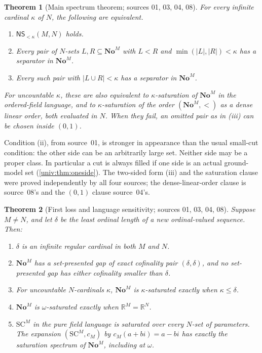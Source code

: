 \documentclass[11pt,letterpaper]{article}
\numberwithin{equation}{section}
\newtheorem{theorem}{Theorem}[section]
\theoremstyle{definition}
\theoremstyle{remark}
\newcommand{\No}{\mathbf{No}}
\newcommand{\SC}{\mathrm{SC}}
\newcommand{\NoM}{\No^{M}}
\newcommand{\SCM}{\SC^{M}}
\newcommand{\R}{\mathbb R}
\newcommand{\NS}{\mathsf{NS}}
\newcommand{\abs}[1]{\lvert#1\rvert}
\begin{document}
\begin{theorem}[Main spectrum theorem; sources 01, 03, 04, 08]\label{univ:thm:main-summary}
For every infinite cardinal $\kappa$ of $N$, the following are equivalent.
\begin{enumerate}[label=\textnormal{(\roman*)}]
\item $\NS_{<\kappa}(M,N)$ holds.
\item Every pair of $N$-sets $L,R\subseteq\NoM$ with $L<R$ and
$\min(\abs L,\abs R)<\kappa$ has a separator in $\NoM$.
\item Every such pair with $\abs{L\cup R}<\kappa$ has a separator in $\NoM$.
\end{enumerate}
For uncountable $\kappa$, these are also equivalent to $\kappa$-saturation of
$\NoM$ in the ordered-field language, and to $\kappa$-saturation of the
order $(\NoM,<)$ as a dense linear order, both evaluated in $N$. When they
fail, an omitted pair as in \textnormal{(iii)} can be chosen inside $(0,1)$.
\end{theorem}

Condition (ii), from source~01, is stronger in appearance than the usual
small-cut condition: the other side can be an arbitrarily large set. Neither
side may be a proper class. In particular a cut is always filled if one side
is an actual ground-model set (\cref{univ:thm:oneside}). The two-sided form
(iii) and the saturation clause were proved independently by all four
sources; the dense-linear-order clause is source~08's and the $(0,1)$ clause
source~04's.

\begin{theorem}[First loss and language sensitivity; sources 01, 03, 04, 08]\label{univ:thm:package-summary}
Suppose $M\ne N$, and let $\delta$ be the least ordinal length of a new
ordinal-valued sequence. Then:
\begin{enumerate}[label=\textnormal{(\roman*)}]
\item $\delta$ is an infinite regular cardinal in both $M$ and $N$.
\item $\NoM$ has a set-presented gap of exact cofinality pair
$(\delta,\delta)$, and no set-presented gap has either cofinality smaller
than $\delta$.
\item For uncountable $N$-cardinals $\kappa$, $\NoM$ is $\kappa$-saturated
exactly when $\kappa\leq\delta$.
\item $\NoM$ is $\omega$-saturated exactly when $\R^M=\R^N$.
\item $\SCM$ in the pure field language is saturated over every $N$-set of
parameters. The expansion $(\SCM,c_M)$ by $c_M(a+bi)=a-bi$ has exactly the
saturation spectrum of $\NoM$, including at $\omega$.
\end{enumerate}
\end{theorem}
\end{document}
